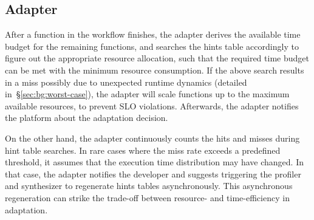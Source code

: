 \subsection{Adapter}
\label{sec:adapter}
After a function in the workflow finishes, the adapter derives the available time budget for the remaining functions, and searches the hints table accordingly to figure out the appropriate resource allocation, such that the required time budget can be met with the minimum resource consumption.
If the above search results in a miss possibly due to unexpected runtime dynamics (detailed in~\S\ref{sec:bg:worst-case}), the adapter will scale functions up to the maximum available resources, to prevent SLO violations.
Afterwards, the adapter notifies the platform about the adaptation decision. 

On the other hand, the adapter continuously counts the hits and misses during hint table searches. 
In rare cases where the miss rate exceeds a predefined threshold, it assumes that the execution time distribution may have changed. 
In that case, the adapter notifies the developer and suggests triggering the profiler and synthesizer to regenerate hints tables asynchronously.
This asynchronous regeneration can strike the trade-off between resource- and time-efficiency in adaptation.

    

